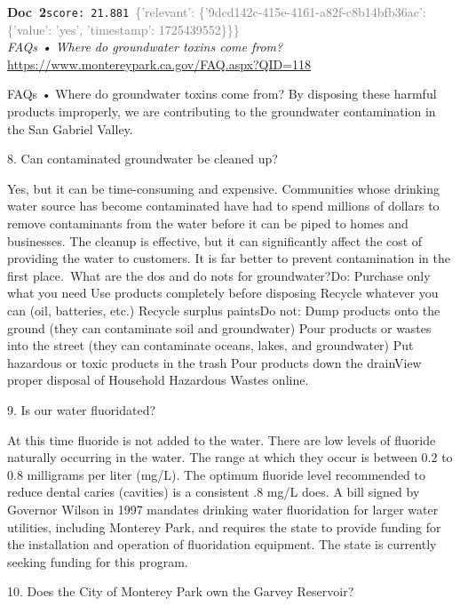 \documentclass[a4paper,11pt]{article}
\begin{document}
\begin{docenv}
{\footnotesize\textcolor{doccolor}{\textbf{Doc~2}}}\hfill{\tiny\texttt{score:~21.881}}\ {\tiny\textcolor{gray}{\{'relevant': \{'9dcd142c-415e-4161-a82f-c8b14bfb36ac': \{'value': 'yes', 'timestamp': 1725439552\}\}\}}}\\[3pt]
{\small\textit{FAQs • Where do groundwater toxins come from?}}\\[2pt]
{\tiny\url{https://www.montereypark.ca.gov/FAQ.aspx?QID=118}}\\[4pt]
{\footnotesize FAQs • Where do groundwater toxins come from?
By disposing these harmful products improperly, we are contributing to the groundwater contamination in the San Gabriel Valley.	

8.
Can contaminated groundwater be cleaned up?

Yes, but it can be time-consuming and expensive. Communities whose drinking water source has become contaminated have had to spend millions of dollars to remove contaminants from the water before it can be piped to homes and businesses. The cleanup is effective, but it can significantly affect the cost of providing the water to customers. It is far better to prevent contamination in the first place. What are the dos and do nots for groundwater?Do: Purchase only what you need Use products completely before disposing Recycle whatever you can (oil, batteries, etc.) Recycle surplus paintsDo not: Dump products onto the ground (they can contaminate soil and groundwater) Pour products or wastes into the street (they can contaminate oceans, lakes, and groundwater) Put hazardous or toxic products in the trash Pour products down the drainView proper disposal of Household Hazardous Wastes online. 

9.
Is our water fluoridated?

At this time fluoride is not added to the water. There are low levels of fluoride naturally occurring in the water. The range at which they occur is between 0.2 to 0.8 milligrams per liter (mg/L). The optimum fluoride level recommended to reduce dental caries (cavities) is a consistent .8 mg/L does. A bill signed by Governor Wilson in 1997 mandates drinking water fluoridation for larger water utilities, including Monterey Park, and requires the state to provide funding for the installation and operation of fluoridation equipment. The state is currently seeking funding for this program.	

10.
Does the City of Monterey Park own the Garvey Reservoir?

}
\end{docenv}
\end{document}

